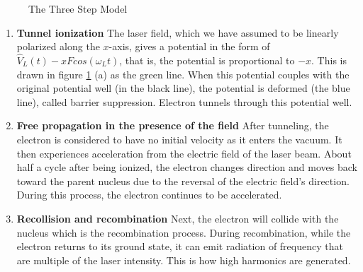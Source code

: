 \begin{figure}[H]
    \centering
    \quad
    \caption{The Three Step Model}%
    \label{fig:three-step}%
\end{figure}

\begin{enumerate}
    \item \textbf{Tunnel ionization} The laser field, which we have assumed to be linearly polarized along the $x$-axis, gives a potential in the form of \(\hat V_L(t)-xFcos(\omega_Lt)\), that is, the potential is proportional to $-x$. This is drawn in figure \ref{fig:three-step} (a) as the green line. When this potential couples with the original potential well (in the black line), the potential is deformed (the blue line), called barrier suppression. Electron tunnels through this potential well.
    \item \textbf{Free propagation in the presence of the field} After tunneling, the electron is considered to have no initial velocity as it enters the vacuum. It then experiences acceleration from the electric field of the laser beam. About half a cycle after being ionized, the electron changes direction and moves back toward the parent nucleus due to the reversal of the electric field's direction. During this process, the electron continues to be accelerated.
    \item \textbf{Recollision and recombination} Next, the electron will collide with the nucleus which is the recombination process. During recombination, while the electron returns to its ground state, it can emit radiation of frequency that are multiple of the laser intensity. This is how high harmonics are generated.
\end{enumerate}

